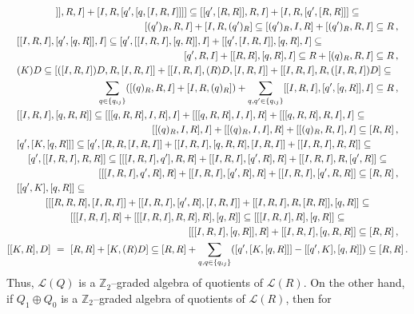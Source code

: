 \documentclass[a4paper,11pt]{article}
\begin{document}
\begin{multline*}
[[q', [q, [I, R, I]]], R, I]+[I, R, [q', [q, [I, R, I]]]]
\subseteq 
[[q', [R, R]], R, I]+[I, R, [q', [R, R]]]\subseteq 
\\
\shoveright{
[(q')_R, R, I]+[I, R, (q')_R]\subseteq 
[(q')_R, I, R]+[(q')_R, R, I]\subseteq R\,,}
\\
\shoveleft{
[[I, R, I], [q', [q, R]], I]\subseteq 
[q', [[I, R, I], [q, R]], I]+[[q', [I, R, I]], [q, R], I]\subseteq}
\\
\shoveright{ 
[q', R, I]+[[R, R], [q, R], I]\subseteq R+[(q)_R, R, I]\subseteq R\,,}
\\
\shoveleft{
(K)D\subseteq 
[([I, R, I])D, R, [I, R, I]]+[[I, R, I], (R)D, [I, R, I]]+
[[I, R, I], R, ([I, R, I])D]\subseteq} 
\\
\shoveright{
\sum_{q\in \{q_{ij}\}} ([(q)_R, R, I]+[I, R, (q)_R])+
\sum_{q, q'\in \{q_{ij}\}} [[I, R, I], [q', [q, R]], I]\subseteq R\,,}
\\
\shoveleft{
[[I, R, I], [q, R, R]]\subseteq 
[[[q, R, R], I, R], I]+[[[q, R, R], I, I], R]+[[[q, R, R], R, I], I]
\subseteq}
\\
\shoveright{
[[(q)_R, I, R], I]+[[(q)_R, I, I], R]+[[(q)_R, R, I], I]
\subseteq [R, R]\,,}
\\
\shoveleft{
[q', [K, [q, R]]]\subseteq 
[q', [R, R, [I, R, I]]+[[I, R, I], [q, R, R], [I, R, I]]+
[[I, R, I], R, R]]\subseteq}
\\
[q', [[I, R, I], R, R]]\subseteq 
[[[I, R, I], q'], R, R]+[[I, R, I], [q', R], R]+[[I, R, I], R, [q', R]]
\subseteq
\\ 
\shoveright{
[[[I, R, I], q', R], R]+[[I, R, I], [q', R], R]+[[I, R, I], [q', R, R]]
\subseteq [R, R]\,,}
\\
\shoveleft{
[[q', K], [q, R]]\subseteq}
\\ 
[[[R, R, R], [I, R, I]]+
[[I, R, I], [q', R], [I, R, I]]+[[I, R, I], R, [R, R]], [q, R]]\subseteq
\\
[[[I, R, I], R]+[[[I, R, I], R, R], R], [q, R]]\subseteq
[[[I, R, I], R], [q, R]]\subseteq
\\
\shoveright{ 
[[[I, R, I], [q, R]], R]+[[I, R, I], [q, R, R]]\subseteq [R, R]\,,}
\\
[[K, R], D]\ =\ [R, R]+[K, (R)D]\subseteq [R, R]+
\sum_{q, q\in \{q_{ij}\}} ([q', [K, [q, R]]]-[[q', K], [q, R]])\subseteq 
[R, R]\,.
\end{multline*}
Thus, $\mathcal{L}(Q)$ is a $\mathbb{Z}_2$--graded algebra of quotients of 
$\mathcal{L}(R)$. On the other hand, if ${Q_1\oplus Q_0}$ is a 
$\mathbb{Z}_2$--graded algebra of quotients of $\mathcal{L}(R)$, then for 
\end{document}

